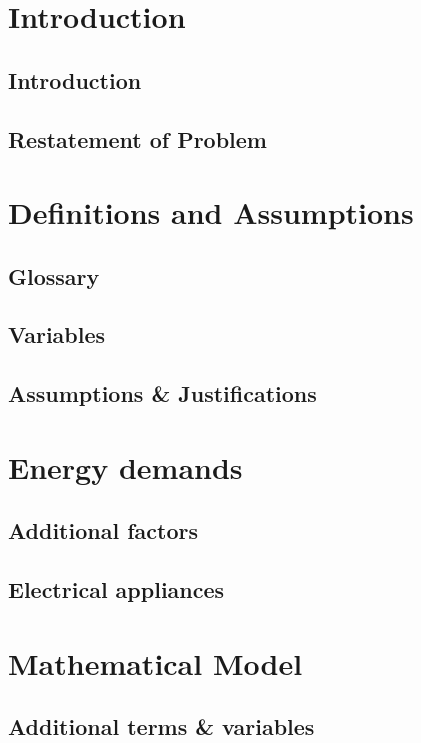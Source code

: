 \documentclass[12pt]{article}
\begin{document}


\tableofcontents
\newpage

\section{Introduction}
\subsection{Introduction}

\subsection{Restatement of Problem}


\section{Definitions and Assumptions}
\subsection{Glossary}

\subsection{Variables}

\subsection{Assumptions \& Justifications}


\section{Energy demands}
\subsection{Additional factors}

\subsection{Electrical appliances}


\section{Mathematical Model}
\subsection{Additional terms \& variables}

\end{document}
